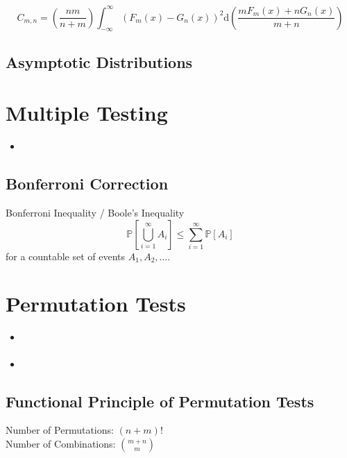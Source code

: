 \documentclass[11pt,twoside,a4paper]{article}
\theoremstyle{MAstyle} \newtheorem{assumption}{Assumption}
\theoremstyle{MAstyle} \newtheorem{definition}{Definition}
\begin{document}
			\cite{buning_nichtparametrische_2013}
			\begin{equation}
				C_{m,n} = \left(\frac{nm}{n+m}\right) \int_{-\infty}^{\infty}\left(F_{m}(x) - G_{n}(x)\right)^{2} \mathrm{d} \left(\frac{m F_{m}(x) + n G_{n}(x)}{m+n}\right)
			\end{equation}
			
		
		\subsection{Asymptotic Distributions}
		
	\section{Multiple Testing}\label{Multiple_Testing}
		\begin{itemize}
			\item \cite{dunn_multiple_1961}
		\end{itemize}
	
		\subsection{Bonferroni Correction}	
			Bonferroni Inequality / Boole's Inequality
			\begin{equation}
				\mathbb{P}\left[\bigcup_{i = 1}^{\infty} A_i\right] \leq \sum_{i = 1}^{\infty} \mathbb{P}\left[A_i\right]
			\end{equation}
			for a countable set of events $A_1, A_2, \dots$.
		
	\section{Permutation Tests}\label{Permutation_Tests}
		\begin{itemize}
			\item \cite{lehmann_testing_2005}
			\item \cite{van_der_vaart_weak_1996}
		\end{itemize}
	
		\subsection{Functional Principle of Permutation Tests}
		
			Number of Permutations: $(n+m)!$\\
			Number of Combinations: $\binom{m+n}{m}$\\
			
\end{document}
